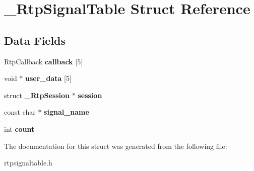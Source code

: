 \section{\+\_\+\+Rtp\+Signal\+Table Struct Reference}
\label{struct__RtpSignalTable}
\subsection*{Data Fields}
\begin{DoxyCompactItemize}
\item 
\mbox{\label{struct__RtpSignalTable_ac1cda4395057e8a24c3a2e9c92a07696}} 
Rtp\+Callback {\bfseries callback} [5]
\item 
\mbox{\label{struct__RtpSignalTable_a48f13efe3bad20c36d88dc5a903f6b41}} 
void $\ast$ {\bfseries user\+\_\+data} [5]
\item 
\mbox{\label{struct__RtpSignalTable_a93650dcb16e60cfef386f4285fcd5437}} 
struct \textbf{ \+\_\+\+Rtp\+Session} $\ast$ {\bfseries session}
\item 
\mbox{\label{struct__RtpSignalTable_ad80e262287b2fdaa92bc6f11d2b87d98}} 
const char $\ast$ {\bfseries signal\+\_\+name}
\item 
\mbox{\label{struct__RtpSignalTable_ac0d29b0d41f6f6e5bee4bc00a5aac873}} 
int {\bfseries count}
\end{DoxyCompactItemize}


The documentation for this struct was generated from the following file\+:\begin{DoxyCompactItemize}
\item 
rtpsignaltable.\+h\end{DoxyCompactItemize}
